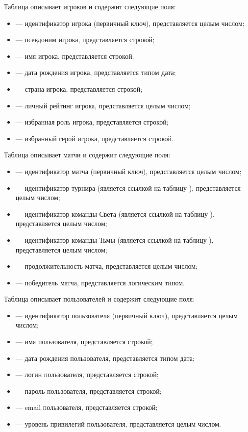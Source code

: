Таблица  описывает игроков и содержит следующие поля:
\begin{itemize}
	\item {} --- идентификатор игрока (первичный ключ), представляется целым числом;
	\item {} --- псевдоним игрока, представляется строкой;
	\item {} --- имя игрока, представляется строкой;
	\item {} --- дата рождения игрока, представляется типом дата;
	\item {} --- страна игрока, представляется строкой;
	\item {} --- личный рейтинг игрока, представляется целым числом;
	\item {} --- избранная роль игрока, представляется строкой;
	\item {} --- избранный герой игрока, представляется строкой.
\end{itemize}

Таблица  описывает матчи и содержит следующие поля:
\begin{itemize}
	\item {} --- идентификатор матча (первичный ключ), представляется целым числом;
	\item {} --- идентификатор турнира (является ссылкой на таблицу ), представляется целым числом;
	\item {} --- идентификатор команды Света (является ссылкой на таблицу ), представляется целым числом;
	\item {} --- идентификатор команды Тьмы (является ссылкой на таблицу ), представляется целым числом;
	\item {} --- продолжительность матча, представляется целым числом;
	\item {} --- победитель матча, представляется логическим типом.
\end{itemize}

Таблица  описывает пользователей и содержит следующие поля:
\begin{itemize}
	\item {} --- идентификатор пользователя (первичный ключ), представляется целым числом;
	\item {} --- имя пользователя, представляется строкой;
	\item {} --- дата рождения пользователя, представляется типом дата;
	\item {} --- логин пользователя, представляется строкой;
	\item {} --- пароль пользователя, представляется строкой;
	\item {} --- email пользователя, представляется строкой;
	\item {} --- уровень привилегий пользователя, представляется целым числом.
\end{itemize}

